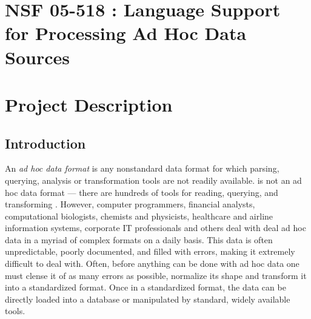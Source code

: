 \documentclass[11pt]{article}
\begin{document}
\setcounter{page}{1}
\appendix
\section{NSF 05-518 \datatype{}: Language Support for Processing Ad Hoc Data Sources}

\newpage
\setcounter{page}{1}
\section{Project Description}

\subsection{Introduction}
\label{ssec:intro}

An {\em ad hoc data format} is any nonstandard data format for which
parsing, querying, analysis or transformation tools are not readily
available.  \xml{} is not an ad hoc data format --- there are hundreds
of tools for reading, querying, and transforming \xml{}.  However,
computer programmers, financial analysts,
computational biologists, chemists and physicists,
healthcare and airline information systems,
corporate IT professionals and 
others deal with deal ad hoc
data in a myriad of complex formats on a daily basis.
This data is often unpredictable, poorly documented, and
filled with errors, making it extremely difficult
to deal with.  Often, before anything can be done with
ad hoc data one must clense it of as many errors as possible,
normalize its shape and transform it into a standardized format. 
Once in a standardized format, the data
can be directly loaded into a database or manipulated by
standard, widely available tools.  
\end{document}
